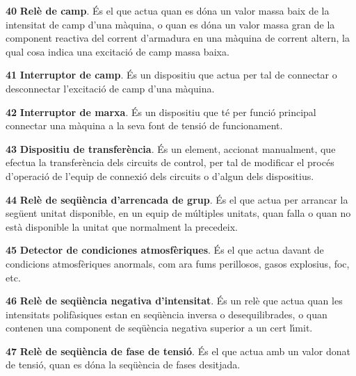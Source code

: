 \begin{multicols}{2}
\begin{list}{}
\item[\textbf{40}]  \textbf{Rel\`{e} de camp}. \'{E}s el que actua quan es
d\'{o}na un valor massa baix de la intensitat de camp d'una m\`{a}quina, o quan es d\'{o}na un valor
massa gran de la component reactiva del corrent d'armadura en una m\`{a}quina de corrent
altern, la qual cosa indica una excitaci\'{o} de camp massa baixa.

\item[\textbf{41}]  \textbf{Interruptor de camp}. \'{E}s un dispositiu
que actua per tal de connectar o desconnectar l'excitaci\'{o} de camp d'una m\`{a}quina.

\item[\textbf{42}]  \textbf{Interruptor de marxa}. \'{E}s un
dispositiu que t\'{e} per funci\'{o} principal connectar una m\`{a}quina a la
seva font de tensi\'{o} de funcionament.

\item[\textbf{43}]  \textbf{Dispositiu de transfer\`{e}ncia}. \'{E}s
un element, accionat manualment, que efectua la transfer\`{e}ncia dels circuits de control, per tal
 de modificar el proc\'{e}s d'operaci\'{o} de l'equip de connexi\'{o} dels circuits o d'algun dels dispositius.

\item[\textbf{44}]  \textbf{Rel\`{e} de seq\"{u}\`{e}ncia
d'arrencada de grup}. \'{E}s el que actua per arrancar la seg\"{u}ent unitat
disponible, en un equip de m\'{u}ltiples unitats, quan falla o quan no
est\`{a} disponible la unitat que normalment la precedeix.

\item[\textbf{45}]  \textbf{Detector de condiciones
atmosf\`{e}riques}. \'{E}s el que actua davant de condicions atmosf\`{e}riques anormals, com ara fums
perillosos, gasos explosius, foc, etc.

\item[\textbf{46}]  \textbf{Rel\`{e} de
seq\"{u}\`{e}ncia negativa d'intensitat}. \'{E}s un rel\`{e} que actua quan les
intensitats polif\`{a}siques estan en seq\"{u}\`{e}ncia inversa o
desequilibrades, o quan contenen una component de seq\"{u}\`{e}ncia negativa
superior a un cert l\'{\i}mit.

\item[\textbf{47}]  \textbf{Rel\`{e}
de seq\"{u}\`{e}ncia de fase de tensi\'{o}}. \'{E}s el que actua amb un valor donat
de tensi\'{o}, quan es d\'{o}na la seq\"{u}\`{e}ncia de fases desitjada.


\end{list}
\end{multicols}
